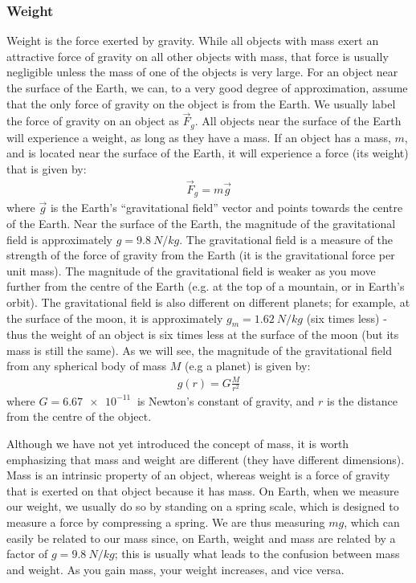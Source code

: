 \subsubsection{Weight}
Weight is the force exerted by gravity. While all objects with mass exert an attractive force of gravity on all other objects with mass, that force is usually negligible unless the mass of one of the objects is very large. For an object near the surface of the Earth, we can, to a very good degree of approximation, assume that the only force of gravity on the object is from the Earth. We usually label the force of gravity on an object as $\vec F_g$. All objects near the surface of the Earth will experience a weight, as long as they have a mass. If an object has a mass, $m$, and is located near the surface of the Earth, it will experience a force (its weight) that is given by:
\begin{align*}
\vec F_g = m\vec g
\end{align*}
where $\vec g$ is the Earth's ``gravitational field'' vector and points towards the centre of the Earth. Near the surface of the Earth, the magnitude of the gravitational field is approximately $g=\SI{9.8}{N/kg}$. The gravitational field is a measure of the strength of the force of gravity from the Earth (it is the gravitational force per unit mass). The magnitude of the gravitational field is weaker as you move further from the centre of the Earth (e.g. at the top of a mountain, or in Earth's orbit). The gravitational field is also different on different planets; for example, at the surface of the moon, it is approximately $g_m=\SI{1.62}{N/kg}$ (six times less) - thus the weight of an object is six times less at the surface of the moon (but its mass is still the same). As we will see, the magnitude of the gravitational field from any spherical body of mass $M$ (e.g a planet) is given by:
\begin{align*}
g(r) = G\frac{M}{r^2}
\end{align*}
where $G=\SI{6.67e-11}{}$ is Newton's constant of gravity, and $r$ is the distance from the centre of the object. 

Although we have not yet introduced the concept of mass, it is worth emphasizing that mass and weight are different (they have different dimensions). Mass is an intrinsic property of an object, whereas weight is a force of gravity that is exerted on that object because it has mass. On Earth, when we measure our weight, we usually do so by standing on a spring scale, which is designed to measure a force by compressing a spring. We are thus measuring $mg$, which can easily be related to our mass since, on Earth, weight and mass are related by a factor of $g=\SI{9.8}{N/kg}$; this is usually what leads to the confusion between mass and weight. As you gain mass, your weight increases, and vice versa.

